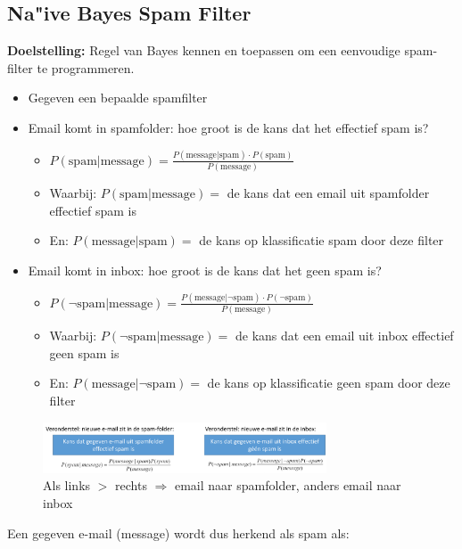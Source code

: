\documentclass{article}
\begin{document}
\subsection{Na"ive Bayes Spam Filter}

\textbf{Doelstelling:} Regel van Bayes kennen en toepassen om een eenvoudige spam-filter te programmeren.

\begin{itemize}
    \item Gegeven een bepaalde spamfilter
    \item Email komt in spamfolder: hoe groot is de kans dat het effectief spam is?
    \begin{itemize}
        \item $P(\text{spam} | \text{message}) = \frac{P(\text{message}|\text{spam}) \cdot P(\text{spam})}{P(\text{message})}$
        \item Waarbij: $P(\text{spam} | \text{message})=$ de kans dat een email uit spamfolder effectief spam is
        \item En: $P(\text{message}|\text{spam})=$ de kans op klassificatie spam door deze filter
    \end{itemize}
    \item Email komt in inbox: hoe groot is de kans dat het geen spam is?
    \begin{itemize}
        \item $P(\neg \text{spam} | \text{message}) = \frac{P(\text{message}|\neg \text{spam}) \cdot P(\neg \text{spam})}{P(\text{message})}$
        \item Waarbij: $P(\neg \text{spam} | \text{message})=$ de kans dat een email uit inbox effectief geen spam is
        \item En: $P(\text{message}| \neg \text{spam})=$ de kans op klassificatie geen spam door deze filter
    \end{itemize}
\end{itemize}

\begin{figure}[H]
    \centering
    \includegraphics[width=0.75\textwidth]{bayes-spam.png}
    \caption{Als links $>$ rechts $\Rightarrow$ email naar spamfolder, anders email naar inbox}
\end{figure}

Een gegeven e-mail (message) wordt dus herkend als spam als:
\end{document}
